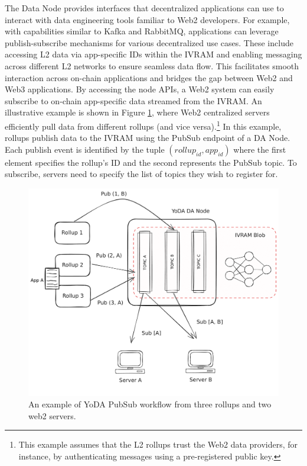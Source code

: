 \documentclass[11pt]{article}
\begin{document}
The Data Node provides interfaces that decentralized applications can use to interact with data engineering tools familiar to Web2 developers. For example, with capabilities similar to Kafka and RabbitMQ, applications can leverage publish-subscribe mechanisms for various decentralized use cases. These include accessing L2 data via app-specific IDs within the IVRAM and enabling messaging across different L2 networks to ensure seamless data flow. This facilitates smooth interaction across on-chain applications and bridges the gap between Web2 and Web3 applications. By accessing the node APIs, a Web2 system can easily subscribe to on-chain app-specific data streamed from the IVRAM.
%
An illustrative example is shown in Figure \ref{fig:yoda-interface}, where Web2 centralized servers efficiently pull data from different rollups (and vice versa).\footnote{This example assumes that the L2 rollups trust the Web2 data providers, for instance, by authenticating messages using a pre-registered public key.} In this example, rollups publish data to the IVRAM using the PubSub endpoint of a DA Node. Each publish event is identified by the tuple $(rollup_{id}, app_{id})$ where the first element specifies the rollup's ID and the second represents the PubSub topic. To subscribe, servers need to specify the list of topics they wish to register for.

\begin{figure}[htp]
    \centering
    \includegraphics[scale=0.2]{images/we2-web3.pdf}
    \caption{An example of YoDA PubSub workflow from three rollups and two web2 servers.}
    \label{fig:yoda-interface}
\end{figure}
\end{document}
